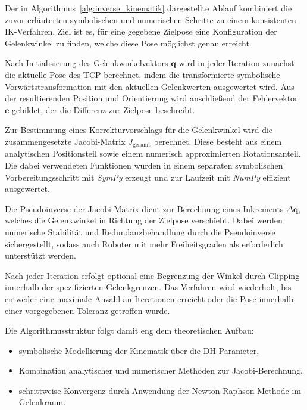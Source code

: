 \vspace{1em}





Der in Algorithmus~\ref{alg:inverse_kinematik} dargestellte Ablauf kombiniert die zuvor erläuterten symbolischen und numerischen Schritte zu einem konsistenten IK-Verfahren. 
Ziel ist es, für eine gegebene Zielpose eine Konfiguration der Gelenkwinkel zu finden, welche diese Pose möglichst genau erreicht.

Nach Initialisierung des Gelenkwinkelvektors $\mathbf{q}$ wird in jeder Iteration zunächst die aktuelle Pose des TCP berechnet, indem die transformierte symbolische Vorwärtstransformation mit den aktuellen Gelenkwerten ausgewertet wird. 
Aus der resultierenden Position und Orientierung wird anschließend der Fehlervektor $\mathbf{e}$ gebildet, der die Differenz zur Zielpose beschreibt.

Zur Bestimmung eines Korrekturvorschlags für die Gelenkwinkel wird die zusammengesetzte Jacobi-Matrix $J_{\text{gesamt}}$ berechnet.
Diese besteht aus einem analytischen Positionsteil sowie einem numerisch approximierten Rotationsanteil.
Die dabei verwendeten Funktionen wurden in einem separaten symbolischen Vorbereitungsschritt mit \textit{SymPy} erzeugt und zur Laufzeit mit \textit{NumPy} effizient ausgewertet.

Die Pseudoinverse der Jacobi-Matrix dient zur Berechnung eines Inkrements $\Delta\mathbf{q}$, welches die Gelenkwinkel in Richtung der Zielpose verschiebt.
Dabei werden numerische Stabilität und Redundanzbehandlung durch die Pseudoinverse sichergestellt, sodass auch Roboter mit mehr Freiheitsgraden als erforderlich unterstützt werden.

Nach jeder Iteration erfolgt optional eine Begrenzung der Winkel durch Clipping innerhalb der spezifizierten Gelenkgrenzen.
Das Verfahren wird wiederholt, bis entweder eine maximale Anzahl an Iterationen erreicht oder die Pose innerhalb einer vorgegebenen Toleranz getroffen wurde.

Die Algorithmusstruktur folgt damit eng dem theoretischen Aufbau:
\vspace{-0.5em}
\begin{itemize}
  \item symbolische Modellierung der Kinematik über die DH-Parameter,
  \item Kombination analytischer und numerischer Methoden zur Jacobi-Berechnung,
  \item schrittweise Konvergenz durch Anwendung der Newton-Raphson-Methode im Gelenkraum.
\end{itemize}


